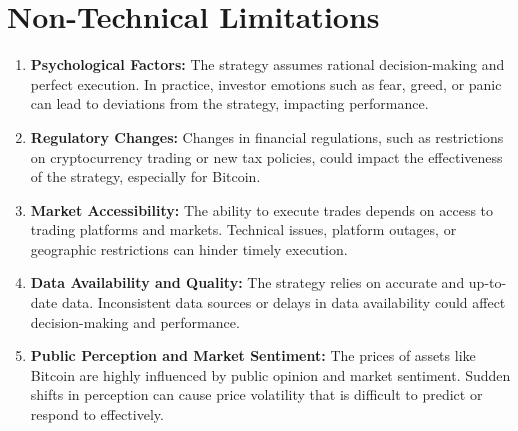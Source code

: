 \section{Non-Technical Limitations}

\begin{enumerate}

    \item \textbf{Psychological Factors:}  
    The strategy assumes rational decision-making and perfect execution. In practice, investor emotions such as fear, greed, or panic can lead to deviations from the strategy, impacting performance.

    \item \textbf{Regulatory Changes:}  
    Changes in financial regulations, such as restrictions on cryptocurrency trading or new tax policies, could impact the effectiveness of the strategy, especially for Bitcoin.

    \item \textbf{Market Accessibility:}  
    The ability to execute trades depends on access to trading platforms and markets. Technical issues, platform outages, or geographic restrictions can hinder timely execution.

    \item \textbf{Data Availability and Quality:}  
    The strategy relies on accurate and up-to-date data. Inconsistent data sources or delays in data availability could affect decision-making and performance.

    \item \textbf{Public Perception and Market Sentiment:}  
    The prices of assets like Bitcoin are highly influenced by public opinion and market sentiment. Sudden shifts in perception can cause price volatility that is difficult to predict or respond to effectively.

\end{enumerate}
